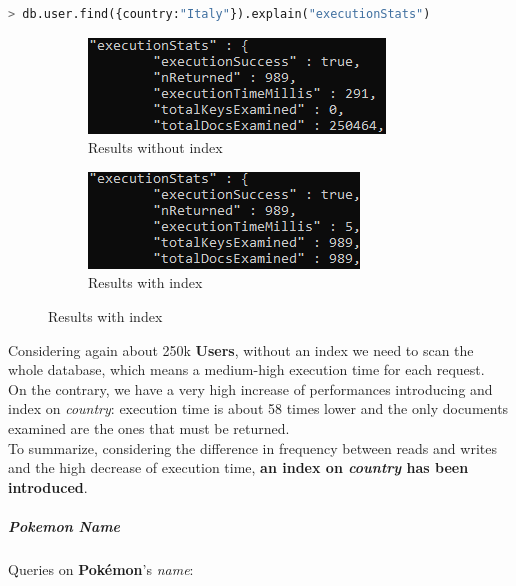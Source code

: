 \begin{lstlisting}[language=python]
	> db.user.find({country:"Italy"}).explain("executionStats")
\end{lstlisting}

\begin{figure}[H]
	\begin{subfigure}{0.5\textwidth}
		\includegraphics[width=0.9\linewidth]{img/CountryNoIndex.png} 
		\caption{Results without index}
	\end{subfigure}
	\begin{subfigure}{0.5\textwidth}
		\includegraphics[width=0.9\linewidth]{img/CountryIndex.png}
		\caption{Results with index}
	\end{subfigure}
\end{figure}

Considering again about 250k \textbf{Users}, without an index we need to scan the whole database, which means a medium-high execution time for each request.\\
On the contrary, we have a very high increase of performances introducing and index on \textit{country}: execution time is about 58 times lower and the only documents examined are the ones that must be returned.\\
To summarize, considering the difference in frequency between reads and writes and the high decrease of execution time, \textbf{an index on \textit{country} has been introduced}.

\subparagraph{Pokemon Name}

Queries on \textbf{Pokémon}’s \textit{name}:

